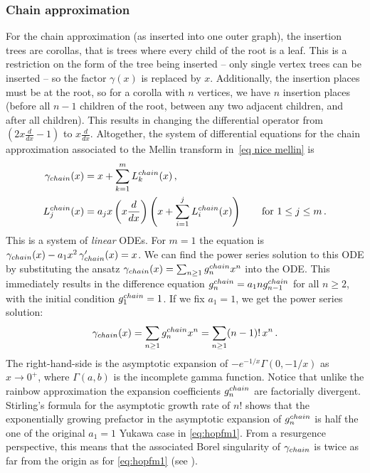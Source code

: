 \documentclass[oneside]{amsart}
\theoremstyle{definition}
\begin{document}
\subsubsection{Chain approximation}
\label{subsubchain}
For the chain approximation (as inserted into one outer graph), the insertion trees are corollas, that is trees where every child of the root is a leaf.  This is a restriction on the form of the tree being inserted -- only single vertex trees can be inserted -- so the factor $\gamma(x)$ is replaced by $x$.  Additionally, the insertion places must be at the root, so for a corolla with $n$ vertices, we have $n$ insertion places (before all $n-1$ children of the root, between any two adjacent children, and after all children).  This results in changing the differential operator from $\left(2x\frac{d}{dx}-1\right)$ to $x\frac{d}{dx}$.  Altogether, the system of differential equations for the chain approximation associated to the Mellin transform in~\eqref{eq nice mellin} is
  \begin{align*} \gamma_{\rm chain}(x) & = x + \sum_{k=1}^m L_k^{\rm chain}(x)\,, \\
 L_j^{\rm chain}(x) & = a_j x \left(x\frac{d}{dx}\right)\left(x + \sum_{i=1}^{j}L_i^{\rm chain}(x)\right) \qquad \text{for $1\leq j\leq m$}\,. \end{align*}
This is a system of {\it linear} ODEs. For $m=1$ the equation is $\gamma_{\rm chain}(x)-a_1 x^2\, \gamma_{\rm chain}^\prime(x)=x$.
We can find the power series solution to this ODE 
by substituting the ansatz $\gamma_{\rm chain}(x) = \sum_{n\geq 1} g^{\rm chain}_n x^n$ into the ODE.
This immediately results in the difference equation
$ g^{\rm chain}_n= a_1 n g^{\rm chain}_{n-1} $
for all $n\geq 2$, with the initial 
condition $g^{\rm chain}_1 = 1$.
If we fix $a_1=1$, we get the power series solution: %
\[
    \gamma_{\rm chain}(x)= 
     \sum_{n\geq 1} g^{\rm chain}_n x^{n}=
    \sum_{n\geq 1}(n-1)! \, x^{n}\,.
\]
The right-hand-side is the asymptotic expansion of $-e^{-1/x}\Gamma(0,-1/x)$ as $x\to 0^+$, where $\Gamma(a, b)$ is the incomplete gamma function. Notice that unlike the rainbow approximation the expansion coefficients $g_n^{\rm chain}$ are factorially divergent. 
Stirling's formula for the asymptotic growth rate of $n!$ shows that the exponentially growing prefactor in the asymptotic expansion of $g_n^{\rm chain}$ is half the one of the original $a_1=1$ Yukawa case in \eqref{eq:hopfm1}.
From a resurgence perspective, this means that the  associated Borel singularity of $\gamma_{\rm chain}$ is twice as far from the origin as for \eqref{eq:hopfm1}
(see \cite{BD}).
%
\end{document}
